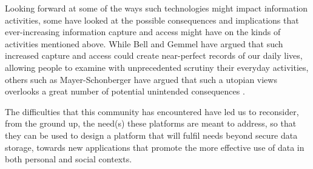 \documentclass[letterpaper]{sig-alternate}
\begin{document}
Looking forward at some of the ways such technologies might impact information activities, some have looked at the possible consequences and implications that ever-increasing information capture and access might have on the kinds of activities mentioned above. While Bell and Gemmel have argued \cite{bell2010total} that such increased capture and access could create near-perfect records of our daily lives, allowing people to examine with unprecedented scrutiny their everyday activities, others such as Mayer-Schonberger have argued that such a utopian views overlooks a great number of potential unintended consequences \cite{mayer-schonberger2013}.  



The difficulties that this community has encountered have led us to reconsider, from the ground up, the need(s) these platforms are meant to address, so that they can be used to design a platform that will fulfil needs beyond secure data storage, towards new applications that promote the more effective use of data in both personal and social contexts.
\end{document}

